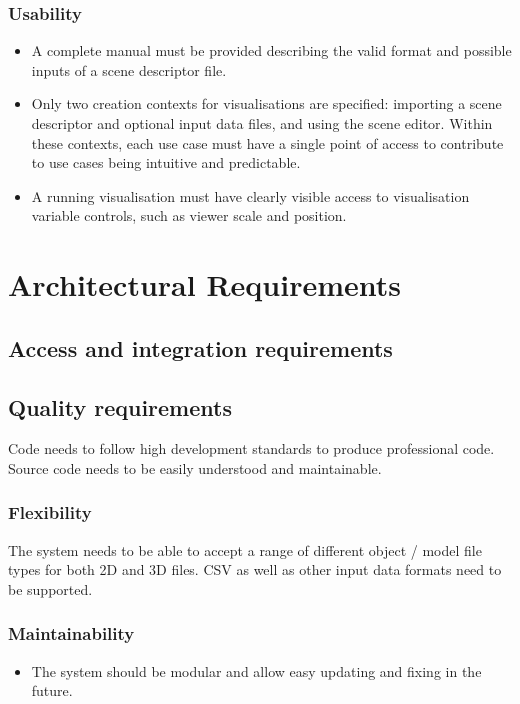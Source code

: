 \documentclass[a4paper,12pt]{article}
\begin{document}
	\subsubsection{Usability}
	
		\begin{itemize}
			\item  A complete manual must be provided describing the valid format and possible inputs of a scene descriptor file.
			\item Only two creation contexts for visualisations are specified: importing a scene descriptor and optional input data files, and using the scene editor. Within these contexts, each use case must have a single point of access to contribute to use cases being intuitive and predictable.
			\item A running visualisation must have clearly visible access to visualisation variable controls, such as viewer scale and position. 
		\end{itemize}

\section{Architectural Requirements}	%

\subsection{Access and integration requirements}

\subsection{Quality requirements}
Code needs to follow high development standards to produce professional code. Source code needs to be easily understood and maintainable.

\subsubsection{Flexibility}
The system needs to be able to accept a range of different object / model file types for both 2D and 3D files. CSV as well as other input data formats need to be supported.

\subsubsection{Maintainability}
	\begin{itemize}
		\item The system should be modular and allow easy updating and fixing in the future.
	\end{itemize}
\end{document}
